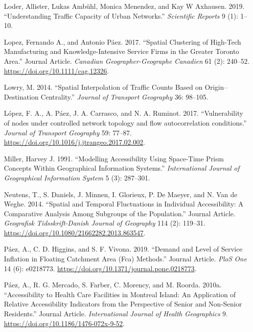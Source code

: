 \documentclass[]{elsarticle} %
\begin{document}
\leavevmode\hypertarget{ref-loder2019understanding}{}%
Loder, Allister, Lukas Ambühl, Monica Menendez, and Kay W Axhausen.
2019. ``Understanding Traffic Capacity of Urban Networks.''
\emph{Scientific Reports} 9 (1): 1--10.

\leavevmode\hypertarget{ref-Lopez2017spatial}{}%
Lopez, Fernando A., and Antonio Páez. 2017. ``Spatial Clustering of
High-Tech Manufacturing and Knowledge-Intensive Service Firms in the
Greater Toronto Area.'' Journal Article. \emph{Canadian
Geographer-Geographe Canadien} 61 (2): 240--52.
\url{https://doi.org/10.1111/cag.12326}.

\leavevmode\hypertarget{ref-Lowry2014}{}%
Lowry, M. 2014. ``Spatial Interpolation of Traffic Counts Based on
Origin--Destination Centrality.'' \emph{Journal of Transport Geography}
36: 98--105.

\leavevmode\hypertarget{ref-Lopez2017}{}%
López, F. A., A. Páez, J. A. Carrasco, and N. A. Ruminot. 2017.
``Vulnerability of nodes under controlled network topology and flow
autocorrelation conditions.'' \emph{Journal of Transport Geography} 59:
77--87. \url{https://doi.org/10.1016/j.jtrangeo.2017.02.002}.

\leavevmode\hypertarget{ref-miller1991modelling}{}%
Miller, Harvey J. 1991. ``Modelling Accessibility Using Space-Time Prism
Concepts Within Geographical Information Systems.'' \emph{International
Journal of Geographical Information System} 5 (3): 287--301.

\leavevmode\hypertarget{ref-Neutens2014spatial}{}%
Neutens, T., S. Daniels, J. Minnen, I. Glorieux, P. De Maeyer, and N.
Van de Weghe. 2014. ``Spatial and Temporal Fluctuations in Individual
Accessibility: A Comparative Analysis Among Subgroups of the
Population.'' Journal Article. \emph{Geografisk Tidsskrift-Danish
Journal of Geography} 114 (2): 119--31.
\url{https://doi.org/10.1080/21662282.2013.863547}.

\leavevmode\hypertarget{ref-Paez2019demand}{}%
Páez, A., C. D. Higgins, and S. F. Vivona. 2019. ``Demand and Level of
Service Inflation in Floating Catchment Area (Fca) Methods.'' Journal
Article. \emph{PloS One} 14 (6): e0218773.
\url{https://doi.org/10.1371/journal.pone.0218773}.

\leavevmode\hypertarget{ref-Paez2010healthcare}{}%
Páez, A., R. G. Mercado, S. Farber, C. Morency, and M. Roorda. 2010a.
``Accessibility to Health Care Facilities in Montreal Island: An
Application of Relative Accessibility Indicators from the Perspective of
Senior and Non-Senior Residents.'' Journal Article. \emph{International
Journal of Health Geographics} 9.
\url{https://doi.org/10.1186/1476-072x-9-52}.
\end{document}
